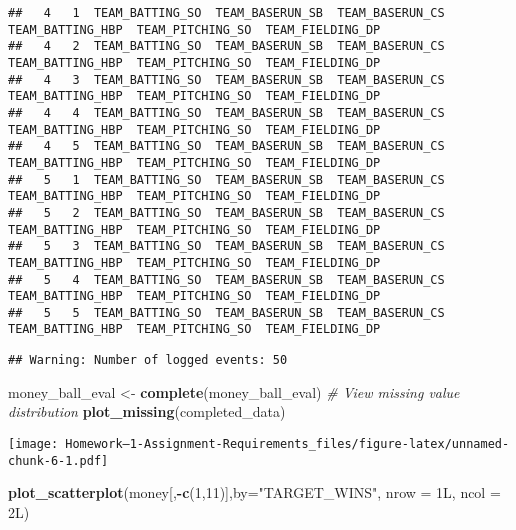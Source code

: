 \documentclass[
]{article}
\newenvironment{Shaded}{\begin{snugshade}}{\end{snugshade}}
\newcommand{\AttributeTok}[1]{\textcolor[rgb]{0.13,0.29,0.53}{#1}}
\newcommand{\CommentTok}[1]{\textcolor[rgb]{0.56,0.35,0.01}{\textit{#1}}}
\newcommand{\DecValTok}[1]{\textcolor[rgb]{0.00,0.00,0.81}{#1}}
\newcommand{\FunctionTok}[1]{\textcolor[rgb]{0.13,0.29,0.53}{\textbf{#1}}}
\newcommand{\NormalTok}[1]{#1}
\newcommand{\OtherTok}[1]{\textcolor[rgb]{0.56,0.35,0.01}{#1}}
\newcommand{\SpecialCharTok}[1]{\textcolor[rgb]{0.81,0.36,0.00}{\textbf{#1}}}
\newcommand{\StringTok}[1]{\textcolor[rgb]{0.31,0.60,0.02}{#1}}
\begin{document}
\begin{verbatim}
##   4   1  TEAM_BATTING_SO  TEAM_BASERUN_SB  TEAM_BASERUN_CS  TEAM_BATTING_HBP  TEAM_PITCHING_SO  TEAM_FIELDING_DP
##   4   2  TEAM_BATTING_SO  TEAM_BASERUN_SB  TEAM_BASERUN_CS  TEAM_BATTING_HBP  TEAM_PITCHING_SO  TEAM_FIELDING_DP
##   4   3  TEAM_BATTING_SO  TEAM_BASERUN_SB  TEAM_BASERUN_CS  TEAM_BATTING_HBP  TEAM_PITCHING_SO  TEAM_FIELDING_DP
##   4   4  TEAM_BATTING_SO  TEAM_BASERUN_SB  TEAM_BASERUN_CS  TEAM_BATTING_HBP  TEAM_PITCHING_SO  TEAM_FIELDING_DP
##   4   5  TEAM_BATTING_SO  TEAM_BASERUN_SB  TEAM_BASERUN_CS  TEAM_BATTING_HBP  TEAM_PITCHING_SO  TEAM_FIELDING_DP
##   5   1  TEAM_BATTING_SO  TEAM_BASERUN_SB  TEAM_BASERUN_CS  TEAM_BATTING_HBP  TEAM_PITCHING_SO  TEAM_FIELDING_DP
##   5   2  TEAM_BATTING_SO  TEAM_BASERUN_SB  TEAM_BASERUN_CS  TEAM_BATTING_HBP  TEAM_PITCHING_SO  TEAM_FIELDING_DP
##   5   3  TEAM_BATTING_SO  TEAM_BASERUN_SB  TEAM_BASERUN_CS  TEAM_BATTING_HBP  TEAM_PITCHING_SO  TEAM_FIELDING_DP
##   5   4  TEAM_BATTING_SO  TEAM_BASERUN_SB  TEAM_BASERUN_CS  TEAM_BATTING_HBP  TEAM_PITCHING_SO  TEAM_FIELDING_DP
##   5   5  TEAM_BATTING_SO  TEAM_BASERUN_SB  TEAM_BASERUN_CS  TEAM_BATTING_HBP  TEAM_PITCHING_SO  TEAM_FIELDING_DP
\end{verbatim}

\begin{verbatim}
## Warning: Number of logged events: 50
\end{verbatim}

\begin{Shaded}
\begin{Highlighting}[]
\NormalTok{money\_ball\_eval }\OtherTok{\textless{}{-}} \FunctionTok{complete}\NormalTok{(money\_ball\_eval)}
\CommentTok{\# View missing value distribution}
\FunctionTok{plot\_missing}\NormalTok{(completed\_data)}
\end{Highlighting}
\end{Shaded}

\texttt{[image: Homework--1-Assignment-Requirements\_files/figure-latex/unnamed-chunk-6-1.pdf]}

\begin{Shaded}
\begin{Highlighting}[]
\FunctionTok{plot\_scatterplot}\NormalTok{(money[,}\SpecialCharTok{{-}}\FunctionTok{c}\NormalTok{(}\DecValTok{1}\NormalTok{,}\DecValTok{11}\NormalTok{)],}\AttributeTok{by=}\StringTok{"TARGET\_WINS"}\NormalTok{, }\AttributeTok{nrow =}\NormalTok{ 1L, }\AttributeTok{ncol =}\NormalTok{ 2L)}
\end{Highlighting}
\end{Shaded}
\end{document}
